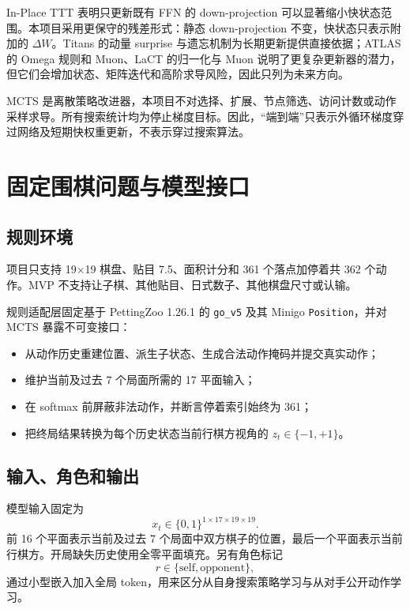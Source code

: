 \documentclass[UTF8,11pt,a4paper]{ctexart}
\newcommand{\code}[1]{\texttt{#1}}
\begin{document}
In-Place TTT 表明只更新既有 FFN 的 down-projection 可以显著缩小快状态范围\cite{inplace}。本项目采用更保守的残差形式：静态 down-projection 不变，快状态只表示附加的 $\Delta W$。Titans 的动量 surprise 与遗忘机制为长期更新提供直接依据\cite{titans}；ATLAS 的 Omega 规则和 Muon、LaCT 的归一化与 Muon 说明了更复杂更新器的潜力\cite{atlas,lact}，但它们会增加状态、矩阵迭代和高阶求导风险，因此只列为未来方向。

MCTS 是离散策略改进器，本项目不对选择、扩展、节点筛选、访问计数或动作采样求导。所有搜索统计均为停止梯度目标。因此，“端到端”只表示外循环梯度穿过网络及短期快权重更新，不表示穿过搜索算法。

\section{固定围棋问题与模型接口}

\subsection{规则环境}

项目只支持 19$\times$19 棋盘、贴目 7.5、面积计分和 361 个落点加停着共 362 个动作。MVP 不支持让子棋、其他贴目、日式数子、其他棋盘尺寸或认输。

规则适配层固定基于 PettingZoo 1.26.1 的 \code{go\_v5} 及其 Minigo \code{Position}\cite{pettingzoo-go,pettingzoo-version}，并对 MCTS 暴露不可变接口：

\begin{itemize}
  \item 从动作历史重建位置、派生子状态、生成合法动作掩码并提交真实动作；
  \item 维护当前及过去 7 个局面所需的 17 平面输入；
  \item 在 softmax 前屏蔽非法动作，并断言停着索引始终为 361；
  \item 把终局结果转换为每个历史状态当前行棋方视角的 $z_t\in\{-1,+1\}$。
\end{itemize}

\subsection{输入、角色和输出}

模型输入固定为
\[
  x_t\in\{0,1\}^{1\times17\times19\times19}.
\]
前 16 个平面表示当前及过去 7 个局面中双方棋子的位置，最后一个平面表示当前行棋方。开局缺失历史使用全零平面填充。另有角色标记
\[
  r\in\{\mathrm{self},\mathrm{opponent}\},
\]
通过小型嵌入加入全局 token，用来区分从自身搜索策略学习与从对手公开动作学习。
\end{document}

